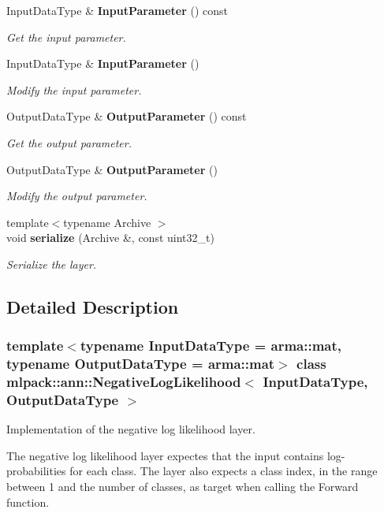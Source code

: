 \begin{DoxyCompactItemize}
Input\+Data\+Type \& \textbf{ Input\+Parameter} () const
\begin{DoxyCompactList}\small\item\em Get the input parameter. \end{DoxyCompactList}\item 
Input\+Data\+Type \& \textbf{ Input\+Parameter} ()
\begin{DoxyCompactList}\small\item\em Modify the input parameter. \end{DoxyCompactList}\item 
Output\+Data\+Type \& \textbf{ Output\+Parameter} () const
\begin{DoxyCompactList}\small\item\em Get the output parameter. \end{DoxyCompactList}\item 
Output\+Data\+Type \& \textbf{ Output\+Parameter} ()
\begin{DoxyCompactList}\small\item\em Modify the output parameter. \end{DoxyCompactList}\item 
{\footnotesize template$<$typename Archive $>$ }\\void \textbf{ serialize} (Archive \&, const uint32\+\_\+t)
\begin{DoxyCompactList}\small\item\em Serialize the layer. \end{DoxyCompactList}\end{DoxyCompactItemize}


\subsection{Detailed Description}
\subsubsection*{template$<$typename Input\+Data\+Type = arma\+::mat, typename Output\+Data\+Type = arma\+::mat$>$\newline
class mlpack\+::ann\+::\+Negative\+Log\+Likelihood$<$ Input\+Data\+Type, Output\+Data\+Type $>$}

Implementation of the negative log likelihood layer. 

The negative log likelihood layer expectes that the input contains log-\/probabilities for each class. The layer also expects a class index, in the range between 1 and the number of classes, as target when calling the Forward function.



